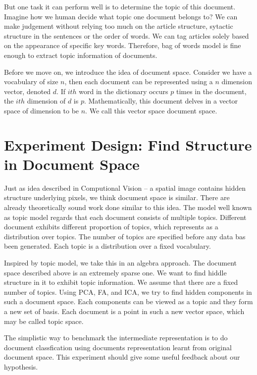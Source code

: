 \documentclass[a4paper]{book}
\begin{document}
  But one task it can perform well is to determine the topic of this
  document. Imagine how we human decide what topic one document belongs
  to? We can make judgement without relying too much on the article
  structure, sytactic structure in the sentences or the order of words.
  We can tag articles solely based on the appearance of specific key
  words. Therefore, bag of words model is fine enough to extract topic
  information of documents.

  Before we move on, we introduce the idea of document space. Consider
  we have a vocabulary of size $n$, then each document can be
  represented using a $n$ dimension vector, denoted $d$. If $ith$ word
  in the dictionary occurs $p$ times in the document, the $ith$
  dimension of $d$ is $p$. Mathematically, this document delves in a
  vector space of dimension to be $n$. We call this vector space
  document space.

  \section{Experiment Design: Find Structure in Document Space}

  Just as idea described in Computional Vision -- a spatial image
  contains hidden structure underlying pixels, we think document space
  is similar. There are already theoretically sound work done similar to
  this idea. The model well known as topic
  model\cite{Blei:2012:PTM:2133806.2133826} regards that each document
  consists of multiple topics. Different document exhibits different
  proportion of topics, which represents as a distribution over topics.
  The number of topics are specified before any data bas been generated.
  Each topic is a distribution over a fixed vocabulary.

  Inspired by topic model, we take this in an algebra approach. The
  document space described above is an extremely sparse one. We want to
  find hiddle structure in it to exhibit topic information. We assume
  that there are a fixed number of topics. Using PCA, FA, and ICA, we
  try to find hidden components in such a document space. Each
  components can be viewed as a topic and they form a new set of basis.
  Each document is a point in such a new vector space, which may be
  called topic space.

  The simplistic way to benchmark the intermediate representation is to
  do document classfication using documents representation learnt from
  original document space. This experiment should give some useful
  feedback about our hypothesis.
\end{document}

